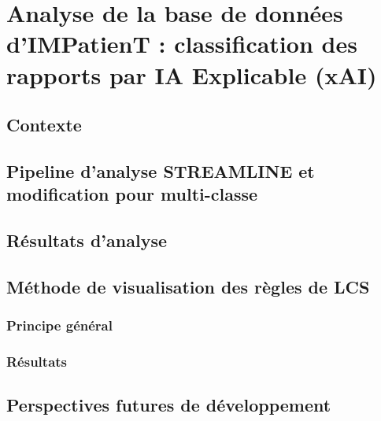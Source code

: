 \chapter{Analyse de la base de données d’IMPatienT : classification des rapports par IA Explicable (xAI)}

\section{Contexte}
\section{Pipeline d'analyse STREAMLINE et modification pour multi-classe}
\section{Résultats d'analyse}
\section{Méthode de visualisation des règles de LCS}
\subsection{Principe général}
\subsection{Résultats}
\section{Perspectives futures de développement}